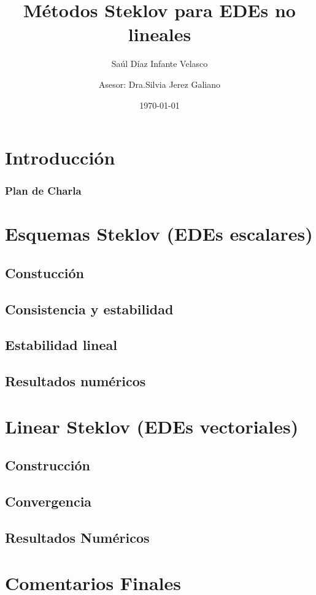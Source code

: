 \documentclass[spanish,10pt,xcolor=dvipsnames,table]{beamer}
\title{Métodos Steklov para EDEs no lineales }
\author[]{Sa\'ul D\'iaz Infante Velasco \and Asesor: Dra.Silvia Jerez Galiano}
\institute{CIMAT A.C.}
\date\today
\theoremstyle{plain} %
\theoremstyle{definition}
\begin{document}
	  \frame{\titlepage \vspace{-0.5cm}}
	 \section*{Introducci\'on}
	 	
	 	\begin{frame}
		\frametitle{Plan de Charla}
	    \tableofcontents[pausesections]
	\end{frame}
	  \section{Esquemas Steklov (EDEs escalares)}
			\subsection{Constucci\'on}
				 
			\subsection{Consistencia y estabilidad}
				
			\subsection{Estabilidad lineal}
				  
			\subsection{Resultados numéricos}
			  	
		\section{Linear Steklov (EDEs vectoriales)}
			\subsection{Construcci\'on}
				
			\subsection{Convergencia}
				
			\subsection{Resultados Numéricos}
					
		\section{Comentarios Finales}	
\end{document}

